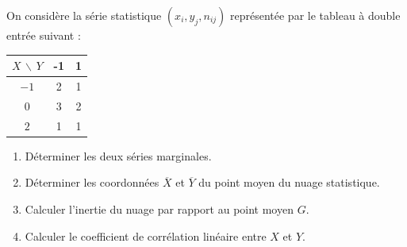 \documentclass[11pt]{article}
\begin{document}

On considère la série statistique $(x_i, y_j, n_{ij})$ représentée par le tableau à double entrée suivant :

\begin{center}
\renewcommand{\arraystretch}{1.3}
\begin{tabular}{|c|c|c|}
\hline
$X\,\backslash\,Y$ & -1 & 1 \\
\hline
$-1$ & 2 & 1 \\
\hline
$0$ & 3 & 2 \\
\hline
$2$ & 1 & 1 \\
\hline
\end{tabular}
\end{center}

\begin{enumerate}
  \item Déterminer les deux séries marginales.
  \item Déterminer les coordonnées $\overline{X}$ et $\overline{Y}$ du point moyen du nuage statistique.
  \item Calculer l'inertie du nuage par rapport au point moyen $G$.
  \item Calculer le coefficient de corrélation linéaire entre $X$ et $Y$.
\end{enumerate}
\end{document}

